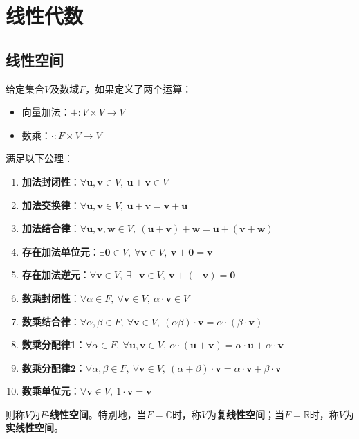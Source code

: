 \section{线性代数}\label{sec:Linear_Algebra}

\subsection{线性空间}\label{sub:linear_space}

\begin{definition}[线性空间]
    给定集合$V$及数域$F$，如果定义了两个运算：
    \begin{itemize}
        \item 向量加法：$+:V\times V\rightarrow V$
        \item 数乘：$\cdot :F\times V\rightarrow V$
    \end{itemize}
    满足以下公理：
    \begin{enumerate}
        \item \textbf{加法封闭性}：$\forall \mathbf{u},\mathbf{v}\in V,\ \mathbf{u}+\mathbf{v}\in V$
        \item \textbf{加法交换律}：$\forall \mathbf{u},\mathbf{v}\in V,\ \mathbf{u}+\mathbf{v}=\mathbf{v}+\mathbf{u}$
        \item \textbf{加法结合律}：$\forall \mathbf{u},\mathbf{v},\mathbf{w}\in V,\ (\mathbf{u}+\mathbf{v})+\mathbf{w}=\mathbf{u}+(\mathbf{v}+\mathbf{w})$
        \item \textbf{存在加法单位元}：$\exists \mathbf{0}\in V,\ \forall \mathbf{v}\in V,\ \mathbf{v}+\mathbf{0}=\mathbf{v}$
        \item \textbf{存在加法逆元}：$\forall \mathbf{v}\in V,\ \exists -\mathbf{v}\in V,\ \mathbf{v}+(-\mathbf{v})=\mathbf{0}$
        \item \textbf{数乘封闭性}：$\forall \alpha\in F,\ \forall \mathbf{v}\in V,\ \alpha\cdot\mathbf{v}\in V$
        \item \textbf{数乘结合律}：$\forall \alpha,\beta\in F,\ \forall \mathbf{v}\in V,\ (\alpha\beta)\cdot\mathbf{v}=\alpha\cdot(\beta\cdot\mathbf{v})$
        \item \textbf{数乘分配律1}：$\forall \alpha\in F,\ \forall \mathbf{u},\mathbf{v}\in V,\ \alpha\cdot(\mathbf{u}+\mathbf{v})=\alpha\cdot\mathbf{u}+\alpha\cdot\mathbf{v}$
        \item \textbf{数乘分配律2}：$\forall \alpha,\beta\in F,\ \forall \mathbf{v}\in V,\ (\alpha+\beta)\cdot\mathbf{v}=\alpha\cdot\mathbf{v}+\beta\cdot\mathbf{v}$
        \item \textbf{数乘单位元}：$\forall \mathbf{v}\in V,\ 1\cdot\mathbf{v}=\mathbf{v}$
    \end{enumerate}
    则称$V$为$F$-\textbf{线性空间}。特别地，当$F=\mathbb{C}$时，称$V$为\textbf{复线性空间}；当$F=\mathbb{R}$时，称$V$为\textbf{实线性空间}。
\end{definition}


